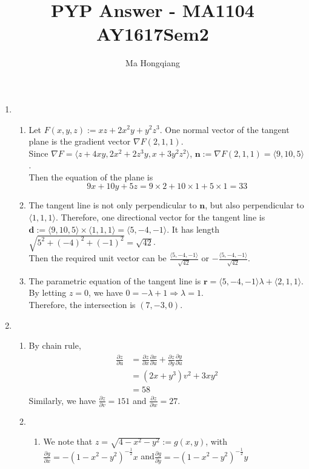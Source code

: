 \documentclass[12pt]{article}
\theoremstyle{definition}
\begin{document}
\title{PYP Answer - MA1104 AY1617Sem2}
\author{Ma Hongqiang}
\maketitle
\begin{enumerate}
  \item \begin{enumerate} %
  \item Let $F(x,y,z):=xz+2x^2y+y^2z^3$. One normal vector of the tangent plane is the gradient vector $\nabla F(2,1,1)$.\\
  Since $\nabla F = \langle z+4xy, 2x^2+2z^3y, x+3y^2z^2\rangle$, $\mathbf{n} := \nabla F(2,1,1)= \langle 9,10,5\rangle$.\\
  Then the equation of the plane is
  \[
9x+10y+5z=9\times 2 + 10\times 1+5\times 1 = 33
  \]
  \item The tangent line is not only perpendicular to $\mathbf{n}$, but also perpendicular to $\langle 1, 1, 1\rangle$. Therefore, one directional vector for the tangent line is $\mathbf{d}:=\langle 9,10, 5\rangle \times \langle 1,1,1\rangle = \langle 5, -4 , -1\rangle$. It has length $\sqrt{5^2+(-4)^2+(-1)^2}=\sqrt{42}$.\\
  Then the required unit vector can be $\frac{\langle 5, -4 , -1\rangle}{\sqrt{42}}$ or $-\frac{\langle 5, -4 , -1\rangle}{\sqrt{42}}$.
  \item The parametric equation of the tangent line is $\mathbf{r}=\langle 5,-4, -1\rangle\lambda+\langle 2,1,1\rangle$. By letting $z=0$, we have $0=-\lambda+1\Rightarrow \lambda = 1$. \\Therefore, the intersection is $(7,-3,0)$. 
  \end{enumerate}
  \item \begin{enumerate}%
  \item By chain rule,
  \begin{align*} \frac{\partial z}{\partial u}&=\frac{\partial z}{\partial x}\frac{\partial x}{\partial u}+\frac{\partial z}{\partial y}\frac{\partial y}{\partial u}\\
  &=(2x+y^3)v^2+3xy^2\\
  &=58
  \end{align*}
  Similarly, we have $\frac{\partial  z}{\partial v}=151$ and $\frac{\partial z}{\partial w}=27$.
  \item \begin{enumerate}
    \item We note that $z=\sqrt{4-x^2-y^2}:=g(x,y)$, with $\frac{\partial g}{\partial x}=-(1-x^2-y^2)^{-\frac{1}{2}}x$ and$ \frac{\partial g}{\partial y}=-(1-x^2-y^2)^{-\frac{1}{2}}y$\\

\end{enumerate}
\end{enumerate}
\end{enumerate}
\end{document}
